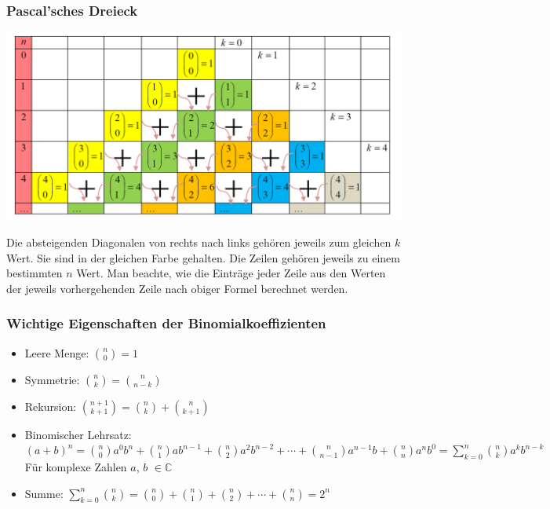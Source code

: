 \subsubsection{Pascal'sches Dreieck}
\begin{center}
    \includegraphics[width=1\textwidth]{images/pascal.png}
\end{center}
Die absteigenden Diagonalen von rechts nach links gehören jeweils zum gleichen $k$ Wert. 
Sie sind in der gleichen Farbe gehalten. Die Zeilen gehören jeweils zu einem bestimmten $n$ Wert. 
Man beachte, wie die Einträge jeder Zeile aus den Werten der jeweils vorhergehenden Zeile nach obiger Formel berechnet werden.
\subsubsection{Wichtige Eigenschaften der Binomialkoeffizienten}
\label{sec:wichtige-eigenschaften-der-binomialkoeffizienten}
\begin{itemize}
    \item Leere Menge: $\binom{n}{0} = 1$
    \item Symmetrie: $\binom{n}{k} = \binom{n}{n-k}$
    \item Rekursion: $\binom{n+1}{k+1} = \binom{n}{k} + \binom{n}{k+1}$
    \item Binomischer Lehrsatz: $(a+b)^n = \binom{n}{0}a^0b^n + \binom{n}{1}ab^{n-1} + \binom{n}{2}a^2b^{n-2} + \cdots + \binom{n}{n-1}a^{n-1}b + \binom{n}{n}a^nb^0 = 
        \sum_{k=0}^n \binom{n}{k}a^kb^{n-k}$ Für komplexe Zahlen $a$, $b$ $\in \mathbb{C}$
    \item Summe: $\sum^n_{k=0} \binom{n}{k} = \binom{n}{0} + \binom{n}{1} + \binom{n}{2} + \cdots + \binom{n}{n} = 2^n$
\end{itemize}